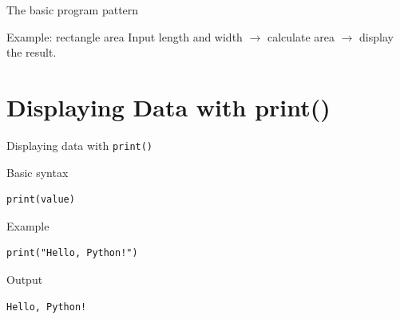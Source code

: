 \documentclass[aspectratio=169,10pt]{beamer}
\begin{document}
\begin{frame}{The basic program pattern}
\begin{center}
\end{center}
\vspace{0.3cm}
\begin{block}{Example: rectangle area}
Input length and width $\rightarrow$ calculate area $\rightarrow$ display the result.
\end{block}
\end{frame}

\section{Displaying Data with print()}

\begin{frame}[fragile]{Displaying data with \texttt{print()}}
\begin{block}{Basic syntax}
\begin{lstlisting}
print(value)
\end{lstlisting}
\end{block}
\begin{exampleblock}{Example}
\begin{lstlisting}
print("Hello, Python!")
\end{lstlisting}
\end{exampleblock}
\begin{block}{Output}
\begin{verbatim}
Hello, Python!
\end{verbatim}
\end{block}
\end{frame}
\end{document}
